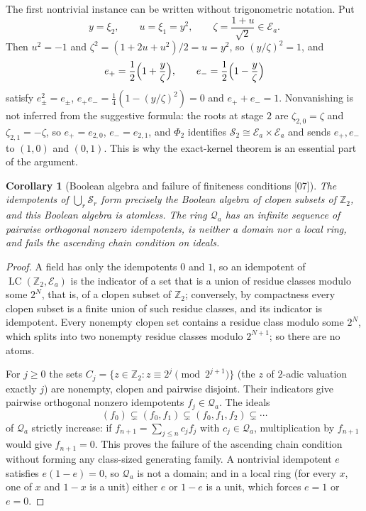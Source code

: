\documentclass[11pt,letterpaper]{article}
\numberwithin{equation}{section}
\newtheorem{corollary}[corollary]{Corollary}
\theoremstyle{definition}
\theoremstyle{remark}
\theoremstyle{plain}
\newcommand{\Z}{\mathbb Z}
\newcommand{\EE}{\mathscr E}         %
\newcommand{\Qa}{\mathcal Q}         %
\newcommand{\LC}{\operatorname{LC}}
\newcommand{\src}[1]{\textup{\textsf{[#1]}}}
\begin{document}
The first nontrivial instance can be written without trigonometric notation. Put
\[
 y=\xi_2,\qquad u=\xi_1=y^2,\qquad \zeta=\frac{1+u}{\sqrt2}\in\EE_a .
\]
Then $u^2=-1$ and $\zeta^2=(1+2u+u^2)/2=u=y^2$, so $(y/\zeta)^2=1$, and
\begin{equation}\label{osq:if:eq:firstidempotents}
 e_+=\frac12\Bigl(1+\frac y\zeta\Bigr),\qquad e_-=\frac12\Bigl(1-\frac y\zeta\Bigr)
\end{equation}
satisfy $e_\pm^2=e_\pm$, $e_+e_-=\frac14(1-(y/\zeta)^2)=0$ and $e_++e_-=1$. Nonvanishing is
not inferred from the suggestive formula: the roots at stage $2$ are
$\zeta_{2,0}=\zeta$ and $\zeta_{2,1}=-\zeta$, so $e_+=e_{2,0}$, $e_-=e_{2,1}$, and
$\Phi_2$ identifies $\mathcal S_2\cong\EE_a\times\EE_a$ and sends $e_+,e_-$ to $(1,0)$ and
$(0,1)$. This is why the exact-kernel theorem is an essential part of the argument.

\begin{corollary}[Boolean algebra and failure of finiteness conditions \src{07}]
\label{osq:if:cor:boolean}
The idempotents of $\bigcup_r\mathcal S_r$ form precisely the Boolean algebra of clopen
subsets of $\Z_2$, and this Boolean algebra is atomless. The ring $\Qa_a$ has an infinite
sequence of pairwise orthogonal nonzero idempotents, is neither a domain nor a local ring,
and fails the ascending chain condition on ideals.
\end{corollary}

\begin{proof}
A field has only the idempotents $0$ and $1$, so an idempotent of $\LC(\Z_2,\EE_a)$ is the
indicator of a set that is a union of residue classes modulo some $2^N$, that is, of a
clopen subset of $\Z_2$; conversely, by compactness every clopen subset is a finite union
of such residue classes, and its indicator is idempotent. Every nonempty clopen set
contains a residue class modulo some $2^N$, which splits into two nonempty residue classes
modulo $2^{N+1}$; so there are no atoms.

For $j\ge0$ the sets $C_j=\{z\in\Z_2:z\equiv2^j\pmod{2^{j+1}}\}$ (the $z$ of $2$-adic
valuation exactly $j$) are nonempty, clopen and pairwise disjoint. Their indicators give
pairwise orthogonal nonzero idempotents $f_j\in\Qa_a$. The ideals
\[
 (f_0)\subsetneq(f_0,f_1)\subsetneq(f_0,f_1,f_2)\subsetneq\cdots
\]
of $\Qa_a$ strictly increase: if $f_{n+1}=\sum_{j\le n}c_jf_j$ with $c_j\in\Qa_a$,
multiplication by $f_{n+1}$ would give $f_{n+1}=0$. This proves the failure of the
ascending chain condition without forming any class-sized generating family. A nontrivial
idempotent $e$ satisfies $e(1-e)=0$, so $\Qa_a$ is not a domain; and in a local ring (for
every $x$, one of $x$ and $1-x$ is a unit) either $e$ or $1-e$ is a unit, which forces
$e=1$ or $e=0$.
\end{proof}
\end{document}

